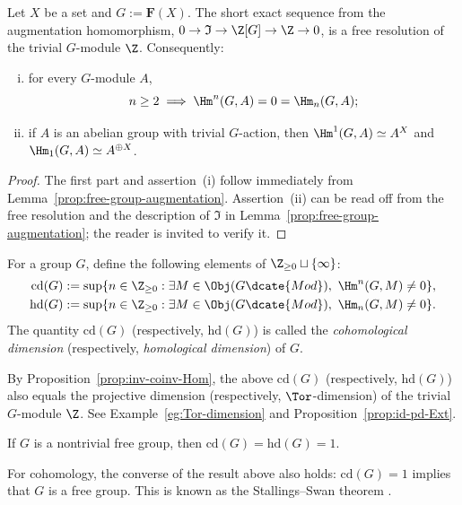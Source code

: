 \begin{proposition}\label{prop:free-group-coh}
	Let $X$ be a set and $G:=\mathbf{F}(X)$. The short exact sequence from the
	augmentation homomorphism,
	$0\to\mathfrak{I}\to\Z[G]\to\Z\to0$, is a free resolution of the trivial
	$G$-module $\Z$. Consequently:
	\begin{enumerate}[(i)]
		\item for every $G$-module $A$,
		\[ n\geq2\implies\Hm^n(G,A)=0=\Hm_n(G,A); \]
		\item if $A$ is an abelian group with trivial $G$-action, then
		$\Hm^1(G,A)\simeq A^X$ and
		$\Hm_1(G,A)\simeq A^{\oplus X}$.
	\end{enumerate}
\end{proposition}
\begin{proof}
	The first part and assertion~(i) follow immediately from
	Lemma~\ref{prop:free-group-augmentation}. Assertion~(ii) can be read off
	from the free resolution and the description of $\mathfrak{I}$ in
	Lemma~\ref{prop:free-group-augmentation}; the reader is invited to verify
	it.
\end{proof}

\begin{definition}\label{def:group-dim}
	For a group $G$, define the following elements of
	$\Z_{\geq0}\sqcup\{\infty\}$:
	\begin{align*}
		\mathrm{cd}(G)&:=\sup\{n\in\Z_{\geq0}:\exists M\in\Obj(G\dcate{Mod}),
		\ \Hm^n(G,M)\neq0\},\\
		\mathrm{hd}(G)&:=\sup\{n\in\Z_{\geq0}:\exists M\in\Obj(G\dcate{Mod}),
		\ \Hm_n(G,M)\neq0\}.
	\end{align*}
	The quantity $\mathrm{cd}(G)$ (respectively, $\mathrm{hd}(G)$) is called
	the \emph{cohomological dimension} (respectively, \emph{homological
	dimension}) of $G$.
\end{definition}

By Proposition~\ref{prop:inv-coinv-Hom}, the above $\mathrm{cd}(G)$
(respectively, $\mathrm{hd}(G)$) also equals the projective dimension
(respectively, $\Tor$-dimension) of the trivial $G$-module $\Z$. See
Example~\ref{eg:Tor-dimension} and Proposition~\ref{prop:id-pd-Ext}.

\begin{corollary}
	If $G$ is a nontrivial free group, then
	$\mathrm{cd}(G)=\mathrm{hd}(G)=1$.
\end{corollary}

For cohomology, the converse of the result above also holds:
$\mathrm{cd}(G)=1$ implies that $G$ is a free group. This is known as the
Stallings--Swan theorem \cite{Sw69}.
